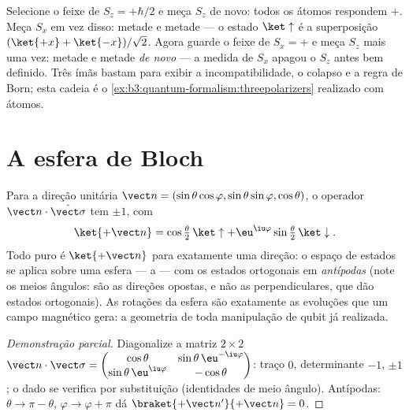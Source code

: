 \begin{example}\label{ex:b3:spin-two-level:chained}
Selecione o feixe de $S_z = +\hbar/2$ e meça $S_z$ de novo: todos os
átomos respondem $+$. Meça $S_x$ em vez disso: metade e metade --- o
estado $\ket\uparrow$ é a superposição $(\ket{+x} + \ket{-x})/\sqrt2$.
Agora guarde o feixe de $S_x = +$ e meça $S_z$ mais uma vez: metade e
metade \emph{de novo} --- a medida de $S_x$ apagou o $S_z$ antes bem
definido. Três ímãs bastam para exibir a incompatibilidade, o colapso e
a regra de Born; esta cadeia é o
\cref{ex:b3:quantum-formalism:threepolarizers} realizado com átomos.
\end{example}

\section{A esfera de Bloch}

\begin{proposition}\label{prop:b3:spin-two-level:bloch}
Para a direção unitária $\vect n = (\sin\theta\cos\varphi,
\sin\theta\sin\varphi, \cos\theta)$, o operador $\vect
n\cdot\hat{\vect\sigma}$ tem  $\pm1$, com
\[
\ket{+\vect n} = \cos\tfrac\theta2\,\ket\uparrow +
\eu^{\iu\varphi}\sin\tfrac\theta2\,\ket\downarrow .
\]
Todo  puro é $\ket{+\vect n}$ para exatamente uma direção: o
espaço de estados se aplica sobre uma esfera --- a \emph{} --- com os estados ortogonais em \emph{antípodas} (note os meios
ângulos: são as direções opostas, e não as perpendiculares, que dão
estados ortogonais). As rotações da esfera são exatamente as evoluções
que um campo magnético gera: a geometria de toda manipulação de qubit
já realizada.
\end{proposition}

\begin{proof}[Demonstração parcial]
Diagonalize a matriz $2\times2$ $\vect n\cdot\vect\sigma =
\begin{pmatrix}\cos\theta & \sin\theta\,\eu^{-\iu\varphi}\\
\sin\theta\,\eu^{\iu\varphi} & -\cos\theta\end{pmatrix}$: traço $0$,
determinante $-1$,  $\pm1$; o  dado se verifica por
substituição (identidades de meio ângulo). Antípodas: $\theta \to \pi -
\theta$, $\varphi \to \varphi + \pi$ dá $\braket{+\vect
n'}{+\vect n} = 0$.
\end{proof}

